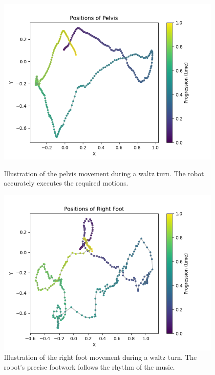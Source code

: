 \documentclass{amsart}
\theoremstyle{definition}
\theoremstyle{plain}
\begin{document}
\begin{figure}[h!]
  \centering
  \begin{minipage}{0.45\textwidth}
    \centering
    \includegraphics[width=\textwidth]{img/Pelvis_positions_with_color_scale.png}
    \caption{Illustration of the pelvis movement during a waltz turn. The robot accurately executes the required motions.}
    \label{fig:pelvis_turn}
  \end{minipage}
  \hfill
  \begin{minipage}{0.45\textwidth}
    \centering
    \includegraphics[width=\textwidth]{img/Right Foot_positions_with_color_scale}
    \caption{Illustration of the right foot movement during a waltz turn. The robot's precise footwork follows the rhythm of the music.}
    \label{fig:right_foot_turn}
  \end{minipage}
\end{figure}
\end{document}

